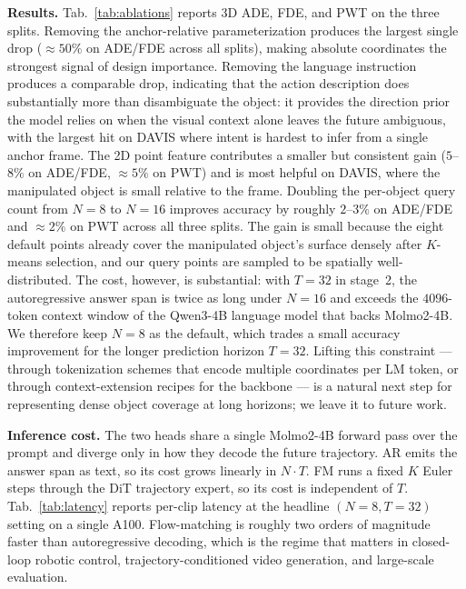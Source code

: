 \noindent\textbf{Results.}
Tab.~\ref{tab:ablations} reports 3D ADE, FDE, and PWT on the three
\benchmarkname{} splits. Removing the anchor-relative parameterization produces
the largest single drop ($\approx 50\%$ on ADE/FDE across all splits), making
absolute coordinates the strongest signal of design importance. Removing the
language instruction produces a comparable drop, indicating that the action
description does substantially more than disambiguate the object: it provides
the direction prior the model relies on when the visual context alone leaves
the future ambiguous, with the largest hit on DAVIS where intent is hardest to
infer from a single anchor frame. The 2D point feature contributes a smaller
but consistent gain ($5$--$8\%$ on ADE/FDE, $\approx 5\%$ on PWT) and is most
helpful on DAVIS, where the manipulated object is small relative to the frame.
Doubling the per-object query count from $N=8$ to $N=16$ improves accuracy by
roughly $2$--$3\%$ on ADE/FDE and $\approx 2\%$ on PWT across all three
splits. The gain is small because the eight default points already cover the
manipulated object's surface densely after $K$-means selection, and our query
points are sampled to be spatially well-distributed. The cost, however, is
substantial: with $T=32$ in stage~2, the autoregressive answer span is twice
as long under $N=16$ and exceeds the $4096$-token context window of the
Qwen3-4B language model that backs Molmo2-4B. We therefore keep $N=8$ as the
default, which trades a small accuracy improvement for the longer prediction
horizon $T=32$. Lifting this constraint --- through tokenization schemes that
encode multiple coordinates per LM token, or through context-extension
recipes for the backbone --- is a natural next step for representing dense
object coverage at long horizons; we leave it to future work.

\noindent\textbf{Inference cost.}
The two heads share a single Molmo2-4B forward pass over the prompt and
diverge only in how they decode the future trajectory. AR emits the
answer span as text, so its cost grows linearly in $N{\cdot}T$. FM runs
a fixed $K$ Euler steps through the DiT trajectory expert, so its cost
is independent of $T$. Tab.~\ref{tab:latency} reports per-clip latency
at the headline $(N{=}8, T{=}32)$ setting on a single A100. Flow-matching
is roughly two orders of magnitude faster than autoregressive decoding,
which is the regime that matters in closed-loop robotic control,
trajectory-conditioned video generation, and large-scale evaluation.

